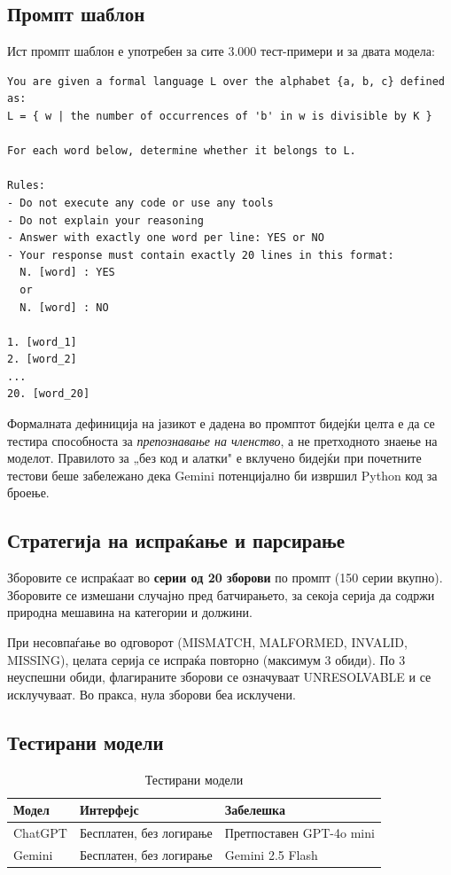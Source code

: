 \documentclass[12pt,a4paper]{article}
\theoremstyle{definition}
\begin{document}
\subsection{Промпт шаблон}

Ист промпт шаблон е употребен за сите 3.000 тест-примери и за двата модела:

\begin{lstlisting}[caption={Промпт шаблон употребен во сите експерименти}]
You are given a formal language L over the alphabet {a, b, c} defined as:
L = { w | the number of occurrences of 'b' in w is divisible by K }

For each word below, determine whether it belongs to L.

Rules:
- Do not execute any code or use any tools
- Do not explain your reasoning
- Answer with exactly one word per line: YES or NO
- Your response must contain exactly 20 lines in this format:
  N. [word] : YES
  or
  N. [word] : NO

1. [word_1]
2. [word_2]
...
20. [word_20]
\end{lstlisting}

Формалната дефиниција на јазикот е дадена во промптот бидејќи целта е да се тестира способноста за \textit{препознавање на членство}, а не претходното знаење на моделот. Правилото за „без код и алатки" е вклучено бидејќи при почетните тестови беше забележано дека Gemini потенцијално би извршил Python код за броење.

\subsection{Стратегија на испраќање и парсирање}

Зборовите се испраќаат во \textbf{серии од 20 зборови} по промпт (150 серии вкупно). Зборовите се измешани случајно пред батчирањето, за секоја серија да содржи природна мешавина на категории и должини.

При несовпаѓање во одговорот (MISMATCH, MALFORMED, INVALID, MISSING), целата серија се испраќа повторно (максимум 3 обиди). По 3 неуспешни обиди, флагираните зборови се означуваат UNRESOLVABLE и се исклучуваат. Во пракса, нула зборови беа исклучени.

\subsection{Тестирани модели}

\begin{table}[H]
\centering
\begin{tabular}{lll}
\toprule
\textbf{Модел} & \textbf{Интерфејс} & \textbf{Забелешка} \\
\midrule
ChatGPT & Бесплатен, без логирање & Претпоставен GPT-4o mini \\
Gemini  & Бесплатен, без логирање & Gemini 2.5 Flash \\
\bottomrule
\end{tabular}
\caption{Тестирани модели}
\end{table}
\end{document}
